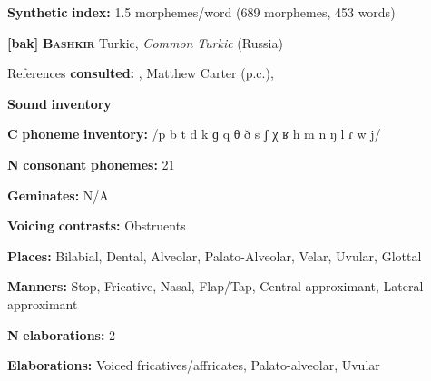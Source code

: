 \begin{styleBody}
\textbf{Synthetic} \textbf{index:} 1.5 morphemes/word (689 morphemes, 453 words)
\end{styleBody}

\begin{styleBody}
\textbf{[bak]}   \textbf{\textsc{Bashkir}}  Turkic, \textit{Common} \textit{Turkic} (Russia)
\end{styleBody}

\begin{styleBody}
References \textbf{consulted:} \citet{BerksonEtAl2016}, Matthew Carter (p.c.), \citet{Poppe1964}
\end{styleBody}

\begin{styleBody}
\textbf{Sound} \textbf{inventory}
\end{styleBody}

\begin{styleBody}
\textbf{C} \textbf{phoneme} \textbf{inventory:} /p b t d k ɡ q θ ð s ʃ χ ʁ h m n ŋ l ɾ w j/
\end{styleBody}

\begin{styleBody}
\textbf{N} \textbf{consonant} \textbf{phonemes:} 21
\end{styleBody}

\begin{styleBody}
\textbf{Geminates:} N/A
\end{styleBody}

\begin{styleBody}
\textbf{Voicing} \textbf{contrasts:} Obstruents
\end{styleBody}

\begin{styleBody}
\textbf{Places:} Bilabial, Dental, Alveolar, Palato-Alveolar, Velar, Uvular, Glottal
\end{styleBody}

\begin{styleBody}
\textbf{Manners:} Stop, Fricative, Nasal, Flap/Tap, Central approximant, Lateral approximant
\end{styleBody}

\begin{styleBody}
\textbf{N} \textbf{elaborations:} 2
\end{styleBody}

\begin{styleBody}
\textbf{Elaborations:} Voiced fricatives/affricates, Palato-alveolar, Uvular
\end{styleBody}

